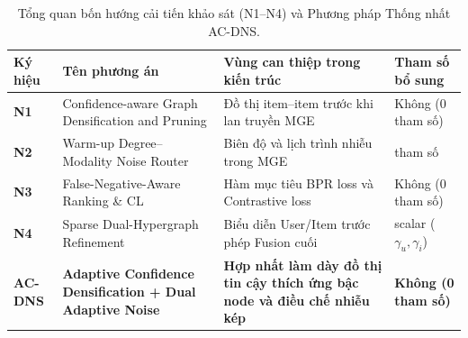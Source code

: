 \begin{table}[H]
\centering
\small
\setlength{\tabcolsep}{5pt}
\caption{Tổng quan bốn hướng cải tiến khảo sát (N1--N4) và Phương pháp Thống nhất AC-DNS.}
\label{tab:negcl_methods_overview}
\begin{tabularx}{\linewidth}{%
    >{\centering\arraybackslash}p{1.4cm}
    >{\raggedright\arraybackslash}p{4.2cm}
    X
    >{\centering\arraybackslash}p{2.2cm}}
\toprule
\textbf{Ký hiệu} & \textbf{Tên phương án} & \textbf{Vùng can thiệp trong kiến trúc} & \textbf{Tham số bổ sung} \\
\midrule
\textbf{N1} & Confidence-aware Graph Densification and Pruning & Đồ thị item--item trước khi lan truyền MGE & Không (0 tham số) \\
\textbf{N2} & Warm-up Degree--Modality Noise Router & Biên độ và lịch trình nhiễu trong MGE & 114 tham số \\
\textbf{N3} & False-Negative-Aware Ranking \& CL & Hàm mục tiêu BPR loss và Contrastive loss & Không (0 tham số) \\
\textbf{N4} & Sparse Dual-Hypergraph Refinement & Biểu diễn User/Item trước phép Fusion cuối & 2 scalar ($\gamma_u, \gamma_i$) \\
\midrule
\textbf{AC-DNS} & \textbf{Adaptive Confidence Densification + Dual Adaptive Noise} & \textbf{Hợp nhất làm dày đồ thị tin cậy thích ứng bậc node và điều chế nhiễu kép} & \textbf{Không (0 tham số)} \\
\bottomrule
\end{tabularx}
\end{table}

